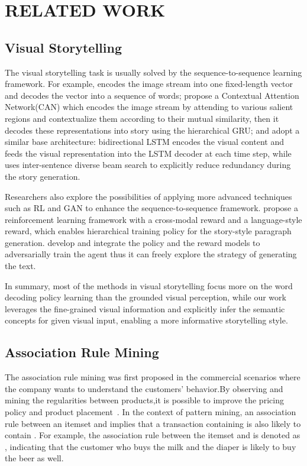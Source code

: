 \documentclass[sigconf]{acmart}
\begin{document}
\section{RELATED WORK}
\subsection{Visual Storytelling}
The visual storytelling task is usually solved by the sequence-to-sequence learning framework. For example, \cite{huang2016visual} encodes the image stream into one fixed-length vector and decodes the vector into a sequence of words; \cite{WangHanQi17} propose a Contextual Attention Network(CAN) which encodes the image stream by attending to various salient regions and contextualize them according to their mutual similarity, then it decodes these representations into story using the hierarchical GRU; \cite{Hsu18} and \cite{Kim18} adopt a similar base architecture: bidirectional LSTM encodes the visual content and feeds the visual representation into the LSTM decoder at each time step, while~\cite{Hsu18} uses inter-sentence diverse beam search to explicitly reduce redundancy during the story generation. 

Researchers also explore the possibilities of applying more advanced techniques such as RL and GAN to enhance the sequence-to-sequence framework. \cite{WangFu18} propose a reinforcement learning framework with a cross-modal reward and a language-style reward, which enables hierarchical training policy for the story-style paragraph generation. \cite{wang2018no} develop and integrate the policy and the reward models to adversarially train the agent thus it can freely explore the strategy of generating the text. 

In summary, most of the methods in visual storytelling focus more on the word decoding policy learning than the grounded visual perception, while our work leverages the fine-grained visual information and explicitly infer the semantic concepts for given visual input, enabling a more informative storytelling style. 

\subsection{Association Rule Mining}
The association rule mining was first proposed in the commercial scenarios where the company wants to understand the customers' behavior.By observing and mining the regularities between products,it is possible to improve the pricing policy and product placement~\cite{agrawal1993mining}. In the context of pattern mining, an association rule between an itemset  and  implies that a transaction containing  is also likely to contain . For example, the association rule between the itemset  and  is denoted as , indicating that the customer who buys the milk and the diaper is likely to buy the beer as well.
\end{document}
